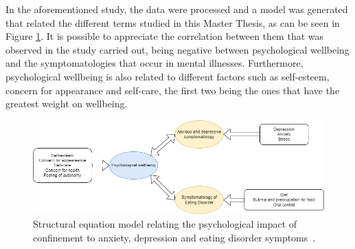In the aforementioned study, the data were processed and a model was generated that related the different terms studied in this Master Thesis, as can be seen in Figure \ref{fig:vall_diagram}. It is possible to appreciate the correlation between them that was observed in the study carried out, being negative between psychological wellbeing and the symptomatologies that occur in mental illnesses. Furthermore, psychological wellbeing is also related to different factors such as self-esteem, concern for appearance and self-care, the first two being the ones that have the greatest weight on wellbeing.

\begin{figure}[!htp]
    \centering
    \includegraphics[scale=0.5]{img/introduction/vall_diagram.png}
    \caption{Structural equation model relating the psychological impact of confinement to anxiety, depression and eating disorder symptoms~\cite{vall2021impacto}.}
    \label{fig:vall_diagram}
\end{figure}







